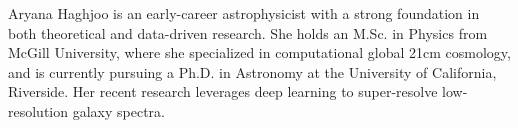 \documentclass[]{kyvernitis-resume}
\begin{document}
\resumeheader
{}
{}
{}
{}
\medskip

Aryana Haghjoo is an early-career astrophysicist with a strong foundation in both theoretical and data-driven research. She holds an M.Sc. in Physics from McGill University, where she specialized in computational global 21cm cosmology, and is currently pursuing a Ph.D. in Astronomy at the University of California, Riverside. Her recent research leverages deep learning to super-resolve low-resolution galaxy spectra.
\end{document}
